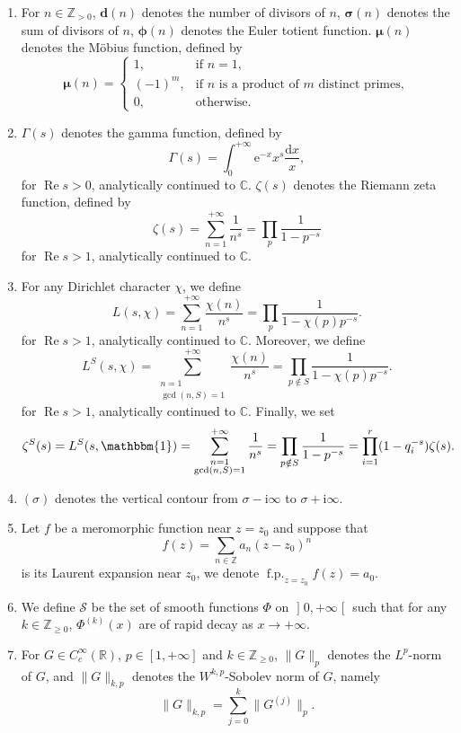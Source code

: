 \documentclass[10pt,oneside,reqno]{amsart}
\newcommand\lopen{\mathopen{]}}
\newcommand\ropen{\mathclose{[}}
\newcommand\rmd{\mathrm{d}}
\newcommand\rme{\mathrm{e}}
\newcommand\rmi{\mathrm{i}}
\newcommand\cS{\mathcal{S}}
\newcommand\CC{\mathbb{C}}
\newcommand\RR{\mathbb{R}}
\newcommand\ZZ{\mathbb{Z}}
\newcommand\triv{\mathbbm{1}}
\renewcommand\Re{\mathop{\mathrm{Re}}}
\DeclareMathOperator\fp{f.p.}
\renewcommand\geq{\geqslant}
\theoremstyle{THEOREM}
\theoremstyle{DEFINITION}
\theoremstyle{EXERCISE}
\numberwithin{equation}{section}
\begin{document}
\begin{enumerate}[itemsep=0pt,parsep=0pt,topsep=0pt,leftmargin=0pt,labelsep=3pt,itemindent=9pt,label=\textbullet]
  \item For $n\in \ZZ_{>0}$, ${\bm d}(n)$ denotes the number of divisors of $n$, ${\bm \sigma}(n)$ denotes the sum of divisors of $n$, ${\bm \phi}(n)$ denotes the Euler totient function. $\bm{\mu}(n)$ denotes the M\"obius function, defined by
  \[
  \bm{\mu}(n)=\begin{cases}
    1, & \text{if $n=1$}, \\
    (-1)^m, & \text{if $n$ is a product of $m$ distinct primes}, \\
    0, & \text{otherwise}.
  \end{cases}
  \]
  \item $\Gamma(s)$ denotes the gamma function, defined by
  \[
  \Gamma(s)=\int_{0}^{+\infty}\rme^{-x}x^s\frac{\rmd x}{x},
  \]
  for $\Re s>0$, analytically continued to $\CC$. $\zeta(s)$ denotes the Riemann zeta function, defined by
  \[
    \zeta(s)=\sum_{n=1}^{+\infty}\frac{1}{n^s}=\prod_{p}\frac{1}{1-p^{-s}}
  \]
  for $\Re s>1$, analytically continued to $\CC$.
  \item For any Dirichlet character $\chi$, we define
  \[
  L(s,\chi)=\sum_{n=1}^{+\infty}\frac{\chi(n)}{n^s}=\prod_{p}\frac{1}{1-\chi(p)p^{-s}}.
  \]
  for $\Re s>1$, analytically continued to $\CC$. Moreover, we define
  \[
  L^S(s,\chi)=\sum_{\substack{n=1\\\gcd(n,S)=1}}^{+\infty}\frac{\chi(n)}{n^s}=\prod_{p\notin S}\frac{1}{1-\chi(p)p^{-s}}.
  \]
  for $\Re s>1$, analytically continued to $\CC$. Finally, we set
  \[
  \zeta^S(s)=L^S(s,\triv)=\sum_{\substack{n=1\\\gcd(n,S)=1}}^{+\infty}\frac{1}{n^s}=\prod_{p\notin S}\frac{1}{1-p^{-s}}=\prod_{i=1}^{r}(1-q_i^{-s})\zeta(s).
  \]
  \item $(\sigma)$ denotes the vertical contour from $\sigma-\rmi\infty$ to $\sigma+\rmi\infty$.
  \item Let $f$ be a meromorphic function near $z=z_0$ and suppose that 
  \[
  f(z)=\sum_{n\in \ZZ}a_n(z-z_0)^n
  \]
  is its Laurent expansion near $z_0$, we denote $\fp_{z=z_0}f(z)=a_0$.
  \item We define $\cS$ be the set of smooth functions $\Phi$ on $\lopen 0,+\infty\ropen$ such that for any $k\in \ZZ_{\geq 0}$, $\Phi^{(k)}(x)$ are of rapid decay as $x\to +\infty$.
  \item For $G\in C_c^\infty(\RR)$, $p\in [1,+\infty]$ and $k\in \ZZ_{\geq 0}$, $\|G\|_p$ denotes the $L^p$-norm of $G$, and $\|G\|_{k,p}$ denotes the $W^{k,p}$-Sobolev norm of $G$, namely
    \[  
    \|G\|_{k,p}=\sum_{j=0}^{k}\|G^{(j)}\|_{p}.
\]
\end{enumerate}
\end{document}
